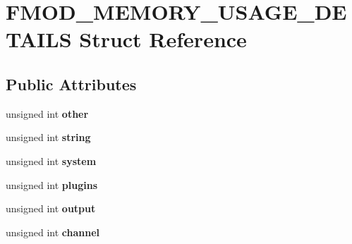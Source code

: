 \hypertarget{struct_f_m_o_d___m_e_m_o_r_y___u_s_a_g_e___d_e_t_a_i_l_s}{\section{F\-M\-O\-D\-\_\-\-M\-E\-M\-O\-R\-Y\-\_\-\-U\-S\-A\-G\-E\-\_\-\-D\-E\-T\-A\-I\-L\-S Struct Reference}
\label{struct_f_m_o_d___m_e_m_o_r_y___u_s_a_g_e___d_e_t_a_i_l_s}
}
\subsection*{Public Attributes}
\begin{DoxyCompactItemize}
\item 
\hypertarget{struct_f_m_o_d___m_e_m_o_r_y___u_s_a_g_e___d_e_t_a_i_l_s_a300e1bdb5199a52da9f003315c6cb15d}{unsigned int {\bfseries other}}\label{struct_f_m_o_d___m_e_m_o_r_y___u_s_a_g_e___d_e_t_a_i_l_s_a300e1bdb5199a52da9f003315c6cb15d}

\item 
\hypertarget{struct_f_m_o_d___m_e_m_o_r_y___u_s_a_g_e___d_e_t_a_i_l_s_ab8c2dedc98802ead3fdc7cbc22e2f3b4}{unsigned int {\bfseries string}}\label{struct_f_m_o_d___m_e_m_o_r_y___u_s_a_g_e___d_e_t_a_i_l_s_ab8c2dedc98802ead3fdc7cbc22e2f3b4}

\item 
\hypertarget{struct_f_m_o_d___m_e_m_o_r_y___u_s_a_g_e___d_e_t_a_i_l_s_a2d1e357014b5080fc3cfbeaef5c62a13}{unsigned int {\bfseries system}}\label{struct_f_m_o_d___m_e_m_o_r_y___u_s_a_g_e___d_e_t_a_i_l_s_a2d1e357014b5080fc3cfbeaef5c62a13}

\item 
\hypertarget{struct_f_m_o_d___m_e_m_o_r_y___u_s_a_g_e___d_e_t_a_i_l_s_a03953fc446eb51222d8db677ade7072f}{unsigned int {\bfseries plugins}}\label{struct_f_m_o_d___m_e_m_o_r_y___u_s_a_g_e___d_e_t_a_i_l_s_a03953fc446eb51222d8db677ade7072f}

\item 
\hypertarget{struct_f_m_o_d___m_e_m_o_r_y___u_s_a_g_e___d_e_t_a_i_l_s_a9dbd43228c9a6b1410c62ea21594b15a}{unsigned int {\bfseries output}}\label{struct_f_m_o_d___m_e_m_o_r_y___u_s_a_g_e___d_e_t_a_i_l_s_a9dbd43228c9a6b1410c62ea21594b15a}

\item 
\hypertarget{struct_f_m_o_d___m_e_m_o_r_y___u_s_a_g_e___d_e_t_a_i_l_s_ae3b48702e225301e37957ac229ab0e16}{unsigned int {\bfseries channel}}\label{struct_f_m_o_d___m_e_m_o_r_y___u_s_a_g_e___d_e_t_a_i_l_s_ae3b48702e225301e37957ac229ab0e16}


\end{DoxyCompactItemize}
